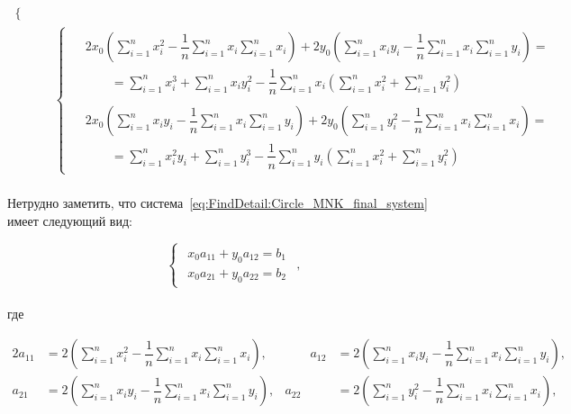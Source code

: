 \begin{align}
\begin{cases}
\begin{aligned}
         \end{aligned}
    \end{cases} \\
    &\begin{cases}
         \label{eq:FindDetail:Circle_MNK_final_system}
         \begin{aligned}
             &2 x_0 \left( \sum_{i=1}^{n} x_i^2 - \dfrac{1}{n} \sum_{i=1}^{n} x_i \sum_{i=1}^{n} x_i \right)
             + 2 y_0 \left( \sum_{i=1}^{n} x_i y_i
             - \dfrac{1}{n} \sum_{i=1}^{n} x_i \sum_{i=1}^{n} y_i \right) = \\
             &\qquad = \sum_{i=1}^{n} x_i^3 + \sum_{i=1}^{n} x_i y_i^2
             - \dfrac{1}{n} \sum_{i=1}^{n} x_i \left( \sum_{i=1}^{n} x_i^2 + \sum_{i=1}^{n} y_i^2 \right) \\
             \\
             &2 x_0 \left( \sum_{i=1}^{n} x_i y_i
             - \dfrac{1}{n} \sum_{i=1}^{n} x_i \sum_{i=1}^{n} y_i \right)
             + 2 y_0 \left( \sum_{i=1}^{n} y_i^2 - \dfrac{1}{n} \sum_{i=1}^{n} x_i \sum_{i=1}^{n} x_i \right) = \\
             &\qquad = \sum_{i=1}^{n} x_i^2 y_i + \sum_{i=1}^{n} y_i^3
             - \dfrac{1}{n} \sum_{i=1}^{n} y_i \left( \sum_{i=1}^{n} x_i^2 + \sum_{i=1}^{n} y_i^2 \right)
         \end{aligned}
    \end{cases}
\end{align} \\

Нетрудно заметить, что система~\ref{eq:FindDetail:Circle_MNK_final_system} имеет следующий вид:

\begin{equation}
    \label{eq:FindDetail:SLAU_system}
    \begin{cases}
        \begin{aligned}
            x_0 a_{11} + y_0 a_{12} = b_1
            \\
            x_0 a_{21} + y_0 a_{22} = b_2
        \end{aligned}
    \end{cases},
\end{equation} \\
где

\begin{alignat*}{2}
    a_{11} &= 2 \left( \sum_{i=1}^{n} x_i^2 - \dfrac{1}{n} \sum_{i=1}^{n} x_i \sum_{i=1}^{n} x_i \right), & \qquad
    a_{12} &= 2 \left( \sum_{i=1}^{n} x_i y_i - \dfrac{1}{n} \sum_{i=1}^{n} x_i \sum_{i=1}^{n} y_i \right), \\
    a_{21} &= 2 \left( \sum_{i=1}^{n} x_i y_i - \dfrac{1}{n} \sum_{i=1}^{n} x_i \sum_{i=1}^{n} y_i \right), &
    a_{22} &= 2 \left( \sum_{i=1}^{n} y_i^2 - \dfrac{1}{n} \sum_{i=1}^{n} x_i \sum_{i=1}^{n} x_i \right),
\end{alignat*} \\

